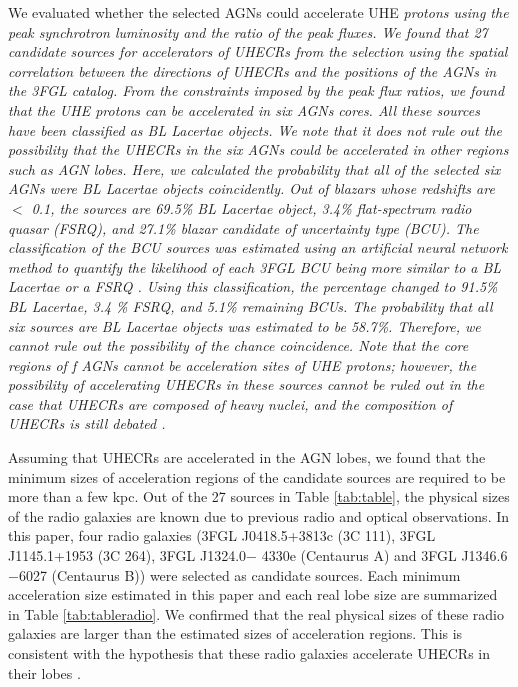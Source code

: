 \documentclass{aastex6}
\begin{document}
We evaluated whether the selected AGNs could accelerate UHE \it{protons}\rm{} using the peak synchrotron luminosity and the ratio of the peak fluxes. 
We found that 27 candidate sources for accelerators of UHECRs from the selection using the spatial correlation between the directions of UHECRs and the positions of the AGNs in the 3FGL catalog.
From the constraints imposed by the peak flux ratios, we found that the UHE \it{protons}\rm{} can be accelerated in six AGNs cores.
All these sources have been classified as BL Lacertae objects.
We note that it does not rule out the possibility that the UHECRs in the six AGNs could be accelerated in other regions such as AGN lobes.
Here, we calculated the probability that all of the selected six AGNs were BL Lacertae objects coincidently.
Out of blazars whose redshifts are $<$ 0.1, the sources are 69.5\% BL Lacertae object, 3.4\% flat-spectrum radio quasar (FSRQ), and 27.1\% blazar candidate of uncertainty type (BCU).
The classification of the BCU sources was estimated using an artificial neural network method to quantify the likelihood of each 3FGL BCU being more similar to a BL Lacertae or a FSRQ \citep{Chiaro}.
Using this classification, the percentage changed to 91.5\% BL Lacertae, 3.4 \% FSRQ, and 5.1\% remaining BCUs.
The probability that all six sources are BL Lacertae objects was estimated to be 58.7\%.
Therefore, we cannot rule out the possibility of the chance coincidence.
Note that the core regions of f AGNs cannot be acceleration sites of UHE \it{protons}\rm{}; however, the possibility of accelerating UHECRs in these sources cannot be ruled out in the case that UHECRs are composed of heavy nuclei, and the composition of UHECRs is still debated \citep[e.g.,][]{TAcomposition,composition,HiRes}.

Assuming that UHECRs are accelerated in the AGN lobes, we found that the minimum sizes of acceleration regions of the candidate sources are required to be more than a few kpc.
Out of the 27 sources in Table \ref{tab:table}, the physical sizes of the radio galaxies are known due to previous radio and optical observations.
In this paper, four radio galaxies (3FGL J0418.5+3813c (3C 111), 3FGL J1145.1+1953 (3C 264), 3FGL J1324.0$-$ 4330e (Centaurus A) and 3FGL J1346.6$-$6027 (Centaurus B)) were selected as candidate sources.
Each minimum acceleration size estimated in this paper and each real lobe size are summarized in Table \ref{tab:tableradio}.
We confirmed that the real physical sizes of these radio galaxies are larger than the estimated sizes of acceleration regions.
This is consistent with the hypothesis that these radio galaxies accelerate UHECRs in their lobes \citep[e.g.,][]{3C264,3C111,CenB, CenAlobe}. 
\end{document}
